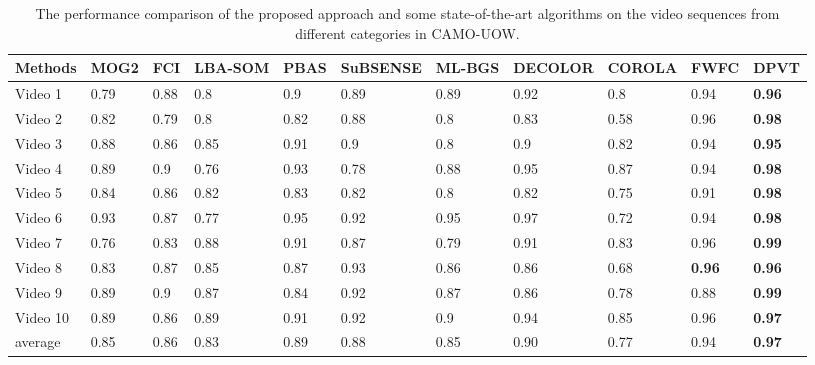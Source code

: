 \documentclass[journal]{IEEEtran}
\begin{document}
    
    \begin{table}[!t]
\centering
\caption{The performance comparison of the proposed approach and some state-of-the-art algorithms on the video sequences from different categories in CAMO-UOW.}
\label{tab3}
\begin{tabular}{lllllllllll}
\hline
Methods  & MOG2\cite{ZIVKOVIC2006773} & FCI\cite{Baf2008FCI}  & LBA-SOM\cite{LBA-SOM2008} & PBAS & SuBSENSE & ML-BGS\cite{ML-BGS2007} & DECOLOR\cite{DECOLOR2013}       & COROLA\cite{SHAKERI201628} & FWFC\cite{Li2018CAMO}          & DPVT          \\ \hline
Video 1  & 0.79 & 0.88 & 0.8     & 0.9  & 0.89     & 0.89   & 0.92          & 0.8    & 0.94 & \textbf{0.96} \\
Video 2  & 0.82 & 0.79 & 0.8     & 0.82 & 0.88     & 0.8    & 0.83          & 0.58   & 0.96          & \textbf{0.98} \\
Video 3  & 0.88 & 0.86 & 0.85    & 0.91 & 0.9      & 0.8    & 0.9           & 0.82   & 0.94 & \textbf{0.95} \\
Video 4  & 0.89 & 0.9  & 0.76    & 0.93 & 0.78     & 0.88   & 0.95          & 0.87   & 0.94          & \textbf{0.98} \\
Video 5  & 0.84 & 0.86 & 0.82    & 0.83 & 0.82     & 0.8    & 0.82          & 0.75   & 0.91          & \textbf{0.98} \\
Video 6  & 0.93 & 0.87 & 0.77    & 0.95 & 0.92     & 0.95   & 0.97	      & 0.72   & 0.94          & \textbf{0.98}  \\
Video 7  & 0.76 & 0.83 & 0.88    & 0.91 & 0.87     & 0.79   & 0.91          & 0.83   & 0.96          & \textbf{0.99} \\
Video 8  & 0.83 & 0.87 & 0.85    & 0.87 & 0.93     & 0.86   & 0.86          & 0.68   & \textbf{0.96}          & \textbf{0.96} \\
Video 9  & 0.89 & 0.9  & 0.87    & 0.84 & 0.92     & 0.87   & 0.86          & 0.78   & 0.88          & \textbf{0.99} \\
Video 10 & 0.89 & 0.86 & 0.89    & 0.91 & 0.92     & 0.9    & 0.94          & 0.85   & 0.96          & \textbf{0.97} \\ \hline
average  & 0.85 & 0.86 & 0.83    & 0.89 & 0.88     & 0.85   & 0.90          & 0.77   & 0.94          & \textbf{0.97} \\ \hline
\end{tabular}
\end{table}
\end{document}
